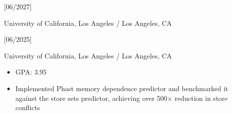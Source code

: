 \documentclass{article}
\begin{document}



[06/2027]

University of California, Los Angeles / Los Angeles, CA

[06/2025]

University of California, Los Angeles / Los Angeles, CA

\begin{itemize}
  \item GPA: 3.95


\end{itemize}





\begin{itemize}
  \item
  Implemented Phast memory dependence predictor and benchmarked it against the
  store sets predictor, achieving over 500$\times$ reduction in store conflicts
\end{itemize}
\end{document}
